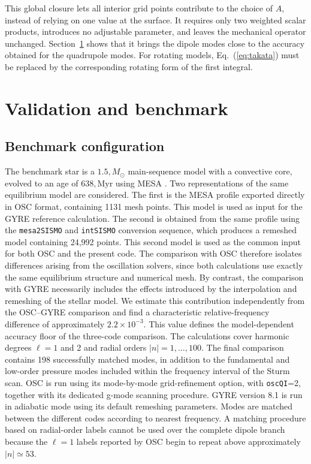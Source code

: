 \documentclass[]{aa}
\begin{document}
This global closure lets all interior grid points contribute to the choice of $A$, instead of relying on one value at the surface. It requires only two weighted scalar products, introduces no adjustable parameter, and leaves the mechanical operator unchanged. Section~\ref{sec:results} shows that it brings the dipole modes close to the accuracy obtained for the quadrupole modes. For rotating models, Eq.~(\ref{eq:takata}) must be replaced by the corresponding rotating form of the first integral.

\section{Validation and benchmark}
\label{sec:results}

\subsection{Benchmark configuration}

The benchmark star is a $1.5,M_\odot$ main-sequence model with a convective core, evolved to an age of $638,\mathrm{Myr}$ using MESA \citep{paxton2011}. Two representations of the same equilibrium model are considered. The first is the MESA profile exported directly in OSC format, containing 1131 mesh points. This model is used as input for the GYRE reference calculation. The second is obtained from the same profile using the \texttt{mesa2SISMO} and \texttt{intSISMO} conversion sequence, which produces a remeshed model containing 24,992 points. This second model is used as the common input for both OSC and the present code. The comparison with OSC therefore isolates differences arising from the oscillation solvers, since both calculations use exactly the same equilibrium structure and numerical mesh. By contrast, the comparison with GYRE necessarily includes the effects introduced by the interpolation and remeshing of the stellar model. We estimate this contribution independently from the OSC--GYRE comparison and find a characteristic relative-frequency difference of approximately $2.2\times10^{-3}$. This value defines the model-dependent accuracy floor of the three-code comparison.
The calculations cover harmonic degrees $\ell=1$ and 2 and radial orders $|n|=1,\ldots,100$. The final comparison contains 198 successfully matched modes, in addition to the fundamental and low-order pressure modes included within the frequency interval of the Sturm scan. OSC is run using its mode-by-mode grid-refinement option, with \texttt{oscQI}=2, together with its dedicated g-mode scanning procedure. GYRE version 8.1 is run in adiabatic mode using its default remeshing parameters. Modes are matched between the different codes according to nearest frequency. A matching procedure based on radial-order labels cannot be used over the complete dipole branch because the $\ell=1$ labels reported by OSC begin to repeat above approximately $|n|\simeq53$.
\end{document}
